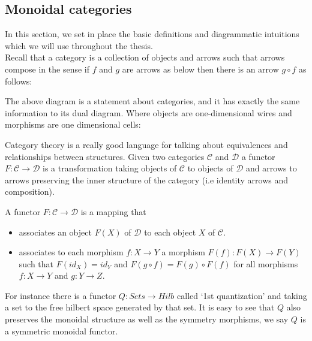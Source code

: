 \documentclass{article}
\newenvironment{definition}[1][Definition]{\begin{trivlist}
\item[\hskip \labelsep {\bfseries #1}]}{\end{trivlist}}
\begin{document}
\subsection{Monoidal categories}
In this section, we set in place the basic definitions and diagrammatic  intuitions which we will use throughout the thesis.\\
Recall that a category is a collection of objects and arrows such that arrows compose in the sense if $f$ and $g$ are arrows as below then there is an arrow $g \circ f$ as follows: 	
\begin{center}
\end{center}
The above diagram is a statement about categories, and it has exactly the same information to its dual diagram. Where objects are one-dimensional wires and morphisms are one dimensional cells:
\begin{center}
\end{center}
Category theory is a really good language for talking about equivalences and relationships between structures.
Given two categories $\mathcal{C}$ and $\mathcal{D}$ a functor $F: \mathcal{C} \rightarrow \mathcal{D}$ is a transformation taking objects of $\mathcal{C}$ to objects of $\mathcal{D}$ and arrows to arrows preserving the inner structure of the category (i.e identity arrows and composition).
\begin{definition}
	A functor $F:\mathcal{C} \rightarrow \mathcal{D}$ is a mapping that
	\begin{itemize}
		\item associates an object $F(X)$ of $\mathcal{D}$ to each object $X$ of $\mathcal{C}$.
		\item associates to each morphism $f:X \rightarrow Y$ a morphism $F(f): F(X) \rightarrow F(Y)$ such that $F(id_X)=id_Y$ and $F(g\circ f)= F(g)\circ F(f)$ for all morphisms $f:X \rightarrow Y$ and $g:Y \rightarrow Z$.
	\end{itemize}
\end{definition}For instance there is a functor $Q: Sets \rightarrow Hilb$ called `1st quantization' and taking a set to the free hilbert space generated by that set. It is easy to see that $Q$ also preserves the monoidal structure as well as the symmetry morphisms, we say $Q$ is a symmetric monoidal functor.
\end{document}
